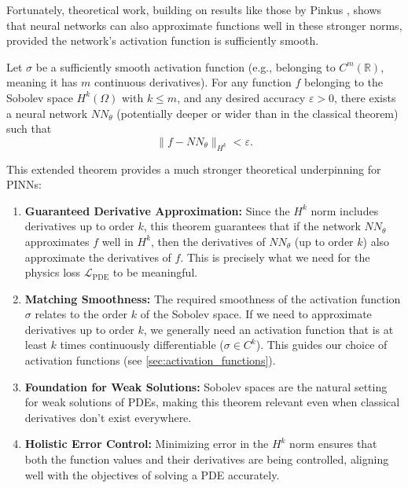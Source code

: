 Fortunately, theoretical work, building on results like those by Pinkus \cite{pinkus1999approximation}, shows that neural networks can also approximate functions well in these stronger norms, provided the network's activation function is sufficiently smooth.

\begin{theorem}
    Let $\sigma$ be a sufficiently smooth activation function (e.g., belonging to $C^m(\mathbb{R})$, meaning it has $m$ continuous derivatives). For any function $f$ belonging to the Sobolev space $H^k(\Omega)$ with $k \leq m$, and any desired accuracy $\varepsilon > 0$, there exists a neural network $NN_\theta$ (potentially deeper or wider than in the classical theorem) such that
    \[
        \|f - NN_\theta\|_{H^k} < \varepsilon.
    \]
\end{theorem}

This extended theorem provides a much stronger theoretical underpinning for PINNs:
\begin{enumerate}
    \item \textbf{Guaranteed Derivative Approximation:} Since the $H^k$ norm includes derivatives up to order $k$, this theorem guarantees that if the network $NN_\theta$ approximates $f$ well in $H^k$, then the derivatives of $NN_\theta$ (up to order $k$) also approximate the derivatives of $f$. This is precisely what we need for the physics loss $\mathcal{L}_{\text{PDE}}$ to be meaningful.
    \item \textbf{Matching Smoothness:} The required smoothness of the activation function $\sigma$ relates to the order $k$ of the Sobolev space. If we need to approximate derivatives up to order $k$, we generally need an activation function that is at least $k$ times continuously differentiable ($\sigma \in C^k$). This guides our choice of activation functions (see \cref{sec:activation_functions}).
    \item \textbf{Foundation for Weak Solutions:} Sobolev spaces are the natural setting for weak solutions of PDEs, making this theorem relevant even when classical derivatives don't exist everywhere.
    \item \textbf{Holistic Error Control:} Minimizing error in the $H^k$ norm ensures that both the function values and their derivatives are being controlled, aligning well with the objectives of solving a PDE accurately.
\end{enumerate}

